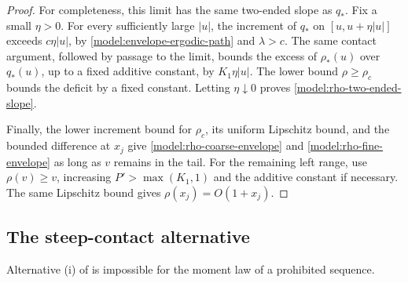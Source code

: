 \begin{proof}
For completeness, this limit has the same two-ended slope as \(q_*\).
Fix a small \(\eta>0\).  For every sufficiently large \(|u|\),
the increment of \(q_*\) on \([u,u+\eta|u|]\) exceeds
\(c\eta|u|\), by \eqref{model:envelope-ergodic-path} and \(\lambda>c\).
The same contact argument, followed by passage to the limit, bounds
the excess of \(\rho_*(u)\) over \(q_*(u)\), up to a fixed additive
constant, by \(K_1\eta|u|\).  The lower bound
\(\rho\ge\rho_c\) bounds the deficit by a fixed constant.
Letting \(\eta\downarrow0\) proves
\eqref{model:rho-two-ended-slope}.

Finally, the lower increment bound for \(\rho_c\), its uniform
Lipschitz bound, and the bounded difference at \(x_j\) give
\eqref{model:rho-coarse-envelope} and
\eqref{model:rho-fine-envelope} as long as \(v\) remains in the tail.
For the remaining left range, use \(\rho(v)\ge v\), increasing
\(P'>\max(K_1,1)\) and the additive constant if necessary.
The same Lipschitz bound gives \(\rho(x_j)=O(1+x_j)\).
\end{proof}

\subsection{The steep-contact alternative}
\label{model:steep-subsection}

\begin{lemma}
\label{model:steep-excluded}
Alternative \textup{(i)} of  is impossible
for the moment law of a prohibited sequence.
\end{lemma}

